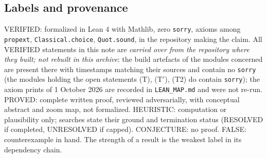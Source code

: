 \documentclass[11pt]{article}
\theoremstyle{remark}
\begin{document}
\subsection{Labels and provenance}
VERIFIED: formalized in Lean 4 with Mathlib, zero \texttt{sorry}, axioms among \texttt{propext}, \texttt{Classical.choice}, \texttt{Quot.sound}, in the repository making the claim. All VERIFIED statements in this note are \emph{carried over from the repository where they built; not rebuilt in this archive}: the build artefacts of the modules concerned are present there with timestamps matching their sources and contain no \texttt{sorry} (the modules holding the open statements (T), (T$'$), (T2) do contain \texttt{sorry}); the axiom prints of 1 October 2026 are recorded in \texttt{LEAN\_MAP.md} and were not re-run. PROVED: complete written proof, reviewed adversarially, with conceptual abstract and zoom map, not formalized. HEURISTIC: computation or plausibility only; searches state their ground and termination status (RESOLVED if completed, UNRESOLVED if capped). CONJECTURE: no proof. FALSE: counterexample in hand. The strength of a result is the weakest label in its dependency chain.
\end{document}

